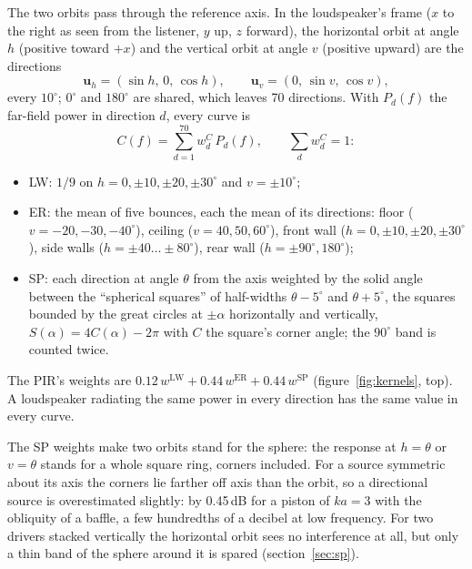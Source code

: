 \documentclass[11pt,a4paper]{article}
\newcommand{\vect}[1]{\mathbf{#1}}
\begin{document}
The two orbits pass through the reference axis. In the loudspeaker's frame ($x$ to the right as seen
from the listener, $y$ up, $z$ forward), the horizontal orbit at angle $h$ (positive toward $+x$) and
the vertical orbit at angle $v$ (positive upward) are the directions
\begin{equation}
\vect u_h = (\sin h,\,0,\,\cos h), \qquad \vect u_v = (0,\,\sin v,\,\cos v),
\end{equation}
every $10^\circ$; $0^\circ$ and $180^\circ$ are shared, which leaves 70 directions. With $P_d(f)$ the
far-field power in direction $d$, every curve is
\begin{equation}
C(f) = \sum_{d=1}^{70} w^C_d\,P_d(f), \qquad \sum_d w^C_d = 1:
\end{equation}
\begin{itemize}
\item LW: $1/9$ on $h = 0, \pm10, \pm20, \pm30^\circ$ and $v = \pm10^\circ$;
\item ER: the mean of five bounces, each the mean of its directions: floor ($v = -20, -30, -40^\circ$),
ceiling ($v = 40, 50, 60^\circ$), front wall ($h = 0, \pm10, \pm20, \pm30^\circ$), side walls
($h = \pm40 \ldots \pm80^\circ$), rear wall ($h = \pm90^\circ, 180^\circ$);
\item SP: each direction at angle $\theta$ from the axis weighted by the solid angle between the
``spherical squares'' of half-widths $\theta - 5^\circ$ and $\theta + 5^\circ$, the squares bounded by
the great circles at $\pm\alpha$ horizontally and vertically, $S(\alpha) = 4C(\alpha) - 2\pi$ with
$C$ the square's corner angle; the $90^\circ$ band is counted twice.
\end{itemize}
The PIR's weights are $0.12\,w^{\mathrm{LW}} + 0.44\,w^{\mathrm{ER}} + 0.44\,w^{\mathrm{SP}}$
(figure~\ref{fig:kernels}, top). A loudspeaker radiating the same power in every direction has the
same value in every curve.

The SP weights make two orbits stand for the sphere: the response at $h = \theta$ or $v = \theta$
stands for a whole square ring, corners included. For a source symmetric about its axis the corners
lie farther off axis than the orbit, so a directional source is overestimated slightly: by 0.45\,dB
for a piston of $ka = 3$ with the obliquity of a baffle, a few hundredths of a decibel at low
frequency. For two drivers stacked vertically the horizontal orbit sees no interference at all, but
only a thin band of the sphere around it is spared (section~\ref{sec:sp}).
\end{document}

